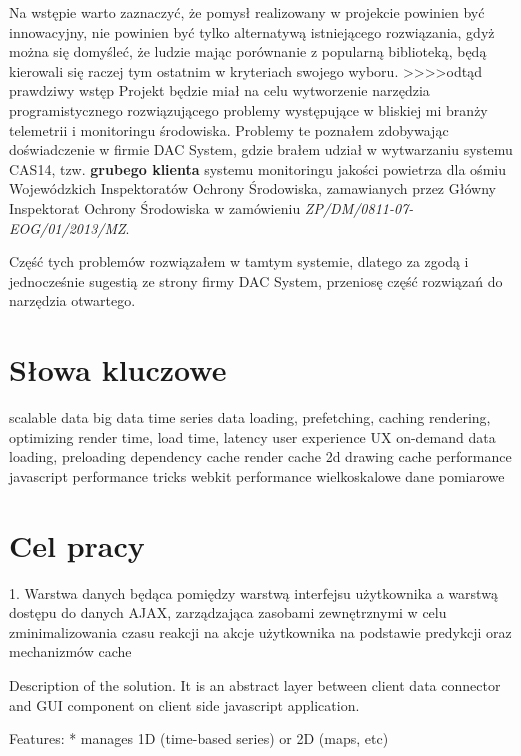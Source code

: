 Na wstępie warto zaznaczyć, że pomysł realizowany w projekcie powinien być innowacyjny, nie powinien być tylko alternatywą istniejącego rozwiązania, gdyż można się domyśleć, że ludzie mając porównanie z popularną biblioteką, będą kierowali się raczej tym ostatnim w kryteriach swojego wyboru.
>>>>odtąd prawdziwy wstęp
Projekt będzie miał na celu wytworzenie narzędzia programistycznego rozwiązującego problemy występujące w bliskiej mi branży telemetrii i monitoringu środowiska. Problemy te poznałem zdobywając doświadczenie w firmie DAC System, gdzie brałem udział w wytwarzaniu systemu CAS14, tzw. \textbf{grubego klienta} systemu monitoringu jakości powietrza dla ośmiu Wojewódzkich Inspektoratów Ochrony Środowiska, zamawianych przez Główny Inspektorat Ochrony Środowiska w zamówieniu \textsl{ZP/DM/0811-07-EOG/01/2013/MZ}.

Część tych problemów rozwiązałem w tamtym systemie, dlatego za zgodą i jednocześnie sugestią ze strony firmy DAC System, przeniosę część rozwiązań do narzędzia otwartego.


\section{Słowa kluczowe}
scalable data
big data
time series data
loading, prefetching, caching
rendering, optimizing
render time, load time, latency
user experience UX
on-demand data loading, preloading
dependency cache
render cache
2d drawing cache performance
javascript performance tricks
webkit performance
wielkoskalowe dane pomiarowe
\section{Cel pracy}

1. Warstwa danych będąca pomiędzy warstwą interfejsu użytkownika a warstwą dostępu do danych AJAX, zarządzająca zasobami zewnętrznymi w celu zminimalizowania czasu reakcji na akcje użytkownika na podstawie predykcji oraz mechanizmów cache


Description of the solution.
It is an abstract layer between client data connector and GUI component on client side javascript application.

Features:
* manages 1D (time-based series) or 2D (maps, etc)

